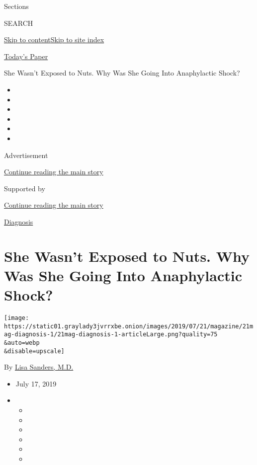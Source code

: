 Sections

SEARCH

\protect\hyperlink{site-content}{Skip to
content}\protect\hyperlink{site-index}{Skip to site index}

\href{https://myaccount.nytimes3xbfgragh.onion/auth/login?response_type=cookie\&client_id=vi}{}

\href{https://www.nytimes3xbfgragh.onion/section/todayspaper}{Today's
Paper}

She Wasn't Exposed to Nuts. Why Was She Going Into Anaphylactic Shock?

\begin{itemize}
\item
\item
\item
\item
\item
\item
\end{itemize}

Advertisement

\protect\hyperlink{after-top}{Continue reading the main story}

Supported by

\protect\hyperlink{after-sponsor}{Continue reading the main story}

\href{/column/diagnosis}{Diagnosis}

\hypertarget{she-wasnt-exposed-to-nuts-why-was-she-going-into-anaphylactic-shock}{%
\section{She Wasn't Exposed to Nuts. Why Was She Going Into Anaphylactic
Shock?}\label{she-wasnt-exposed-to-nuts-why-was-she-going-into-anaphylactic-shock}}

\texttt{[image: https://static01.graylady3jvrrxbe.onion/images/2019/07/21/magazine/21mag-diagnosis-1/21mag-diagnosis-1-articleLarge.png?quality=75\\\&auto=webp\\\&disable=upscale]}

By \href{https://www.nytimes3xbfgragh.onion/by/lisa-sanders-md}{Lisa
Sanders, M.D.}

\begin{itemize}
\item
  July 17, 2019
\item
  \begin{itemize}
  \item
  \item
  \item
  \item
  \item
  \item
  \end{itemize}
\end{itemize}

